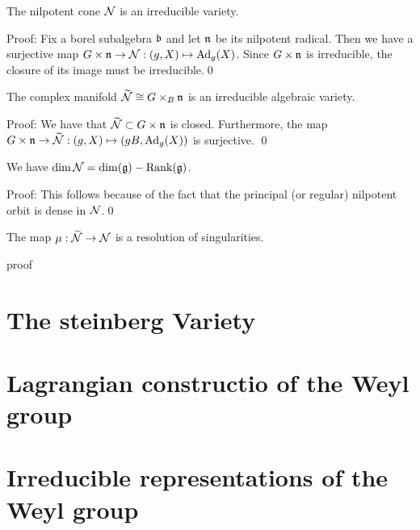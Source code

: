 \begin{dang}
    \begin{proposition}
    The nilpotent cone $\mathcal{N}$ is an irreducible variety.        
    \end{proposition}
\end{dang}
Proof: Fix a borel subalgebra $\mathfrak{b}$ and let $\mathfrak{n}$ be its nilpotent radical. Then we have a surjective map 
$G\times\mathfrak{n}\to \mathcal{N}: (g,X)\mapsto \text{Ad}_g(X)$. Since $G\times\mathfrak{n}$ is irreducible, the closure of its image 
must be irreducible.\qed 

\begin{dang}
    \begin{proposition}
        The complex manifold $\widetilde{\mathcal{N}}\cong G\times_B\mathfrak{n}$ is an irreducible algebraic 
        variety. 
    \end{proposition}
\end{dang}
Proof: We have that $\widetilde{\mathcal{N}} \subset G\times \mathfrak{n}$ is closed. Furthermore, the map 
$G\times\mathfrak{n}\to \widetilde{\mathcal{N}}:(g,X)\mapsto (gB,\text{Ad}_g(X))$ is surjective. \qed

\begin{dang}
    \begin{proposition}
        We have $\dim\mathcal{N} = \dim(\mathfrak{g})-\text{Rank}(\mathfrak{g})$.
    \end{proposition}
\end{dang}
Proof: This follows because of the fact that the principal (or regular) nilpotent orbit is dense in $\mathcal{N}$.\qed

\begin{dang}
    \begin{proposition}
        The map $\mu:\widetilde{\mathcal{N}}\to\mathcal{N}$ is a resolution of singularities.
    \end{proposition}
\end{dang}
\TODO proof

\section{The steinberg Variety}
\section{Lagrangian constructio of the Weyl group}
\section{Irreducible representations of the Weyl group}